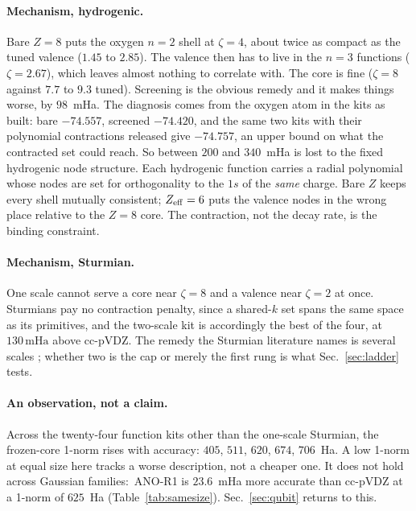 \documentclass[aps,pra,twocolumn,superscriptaddress,longbibliography]{revtex4-2}
\newcommand{\gvq}[2]{#2}
\newcommand{\mHa}{\,\mathrm{mHa}}
\begin{document}
\paragraph{Mechanism, hydrogenic.}  Bare $Z=8$ puts the oxygen $n=2$
shell at $\zeta=4$, about twice as compact as the tuned valence
($1.45$ to $2.85$).  The valence then has to live in the $n=3$
functions ($\zeta=2.67$), which leaves almost nothing to correlate with.
The core is fine ($\zeta=8$ against $7.7$ to $9.3$ tuned).  Screening
is the obvious remedy and it makes things worse, by $98$~mHa.  The
diagnosis comes from the oxygen atom in the kits as built: bare
$-74.557$, screened $-74.420$, and the same two kits with their
polynomial contractions released give $-74.757$, an upper bound on what
the contracted set could reach.  So between $200$ and $340$~mHa is lost
to the fixed hydrogenic node structure.  Each hydrogenic function
carries a radial polynomial whose nodes are set for orthogonality to the
$1s$ of the \emph{same} charge.  Bare $Z$ keeps every shell mutually
consistent; $Z_{\rm eff}=6$ puts the valence nodes in the wrong place
relative to the $Z=8$ core.  The contraction, not the decay rate, is
the binding constraint.

\paragraph{Mechanism, Sturmian.}  One scale cannot serve a core near
$\zeta=8$ and a valence near $\zeta=2$ at once.  Sturmians pay no
contraction penalty, since a shared-$k$ set spans the same space as its
primitives, and the two-scale kit is accordingly the best of the four,
at $\gvq{p62_two_scale_above_ccpvdz_mha}{130}\mHa$ above cc-pVDZ.
The remedy the Sturmian literature names is several scales
\cite{avery2006}; whether two is the cap or merely the first rung is
what Sec.~\ref{sec:ladder} tests.

\paragraph{An observation, not a claim.}  Across the twenty-four
function kits other than the one-scale Sturmian, the frozen-core
1-norm rises with accuracy: $405$, $511$, $620$, $674$, $706$~Ha.  A
low 1-norm at equal size here tracks a worse description, not a cheaper
one.  It does not hold across Gaussian families:\ ANO-R1 is
$23.6$~mHa more accurate than cc-pVDZ at a 1-norm of $625$~Ha
(Table~\ref{tab:samesize}).  Sec.~\ref{sec:qubit} returns to this.
\end{document}
